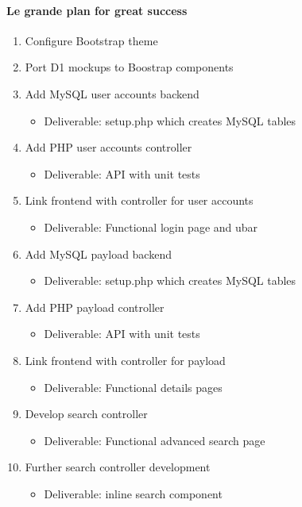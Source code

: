 \paragraph{Le grande plan for great success}
\begin{enumerate}
\item Configure Bootstrap theme
\item Port D1 mockups to Boostrap components
\item Add MySQL user accounts backend
\begin{itemize}
\item Deliverable: setup.php which creates MySQL tables
\end{itemize}
\item Add PHP user accounts controller
\begin{itemize}
\item Deliverable: API with unit tests
\end{itemize}
\item Link frontend with controller for user accounts
\begin{itemize}
\item Deliverable: Functional login page and ubar
\end{itemize}
\item Add MySQL payload backend
\begin{itemize}
\item Deliverable: setup.php which creates MySQL tables
\end{itemize}
\item Add PHP payload controller
\begin{itemize}
\item Deliverable: API with unit tests
\end{itemize}
\item Link frontend with controller for payload
\begin{itemize}
\item Deliverable: Functional details pages
\end{itemize}
\item Develop search controller
\begin{itemize}
\item Deliverable: Functional advanced search page
\end{itemize}
\item Further search controller development
\begin{itemize}
\item Deliverable: inline search component
\end{itemize}
\end{enumerate}

